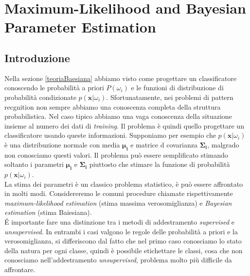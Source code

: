 %
%
%

\chapter{Maximum-Likelihood and Bayesian Parameter Estimation}\label{tecnicheParametriche}
\section{Introduzione}
Nella sezione \ref{teoriaBaesiana} abbiamo visto come progettare un classificatore conoscendo le probabilità a priori $P(\omega_i)$ e le funzioni di distribuzione di probabilità condizionate $p(\mathbf{x}|\omega_i)$. Sfortunatamente, nei problemi di pattern recgnition non sempre abbiamo una conoscenza completa della struttura probabilistica. Nel caso tipico abbiamo una vaga conoscenza della situazione insieme al numero dei dati di \emph{training}. Il problema è quindi quello progettare un classificatore usando queste informazioni.  Supponiamo per esempio che $p(\mathbf{x}|\omega_i)$ è una distribuzione normale con media $\mathbf{\mu_i}$ e matrice d covarianza $\mathbf{\Sigma_i}$, malgrado non conosciamo questi valori. Il problema può essere semplificato stimando soltanto i parametri $\mathbf{\mu_i}$ e $\mathbf{\Sigma_i}$ piuttosto che stimare la funzione di probabilità $p(\mathbf{x}|\omega_i)$.\\

\noindent La stima dei parametri è un classico problema statistico, è può essere affrontato in molti modi. Considereremo le comuni procedure chiamate rispettivamente \emph{maximum-likelihood estimation} (stima massima verosomiglianza) e \emph{Bayesian estimation} (stima Baiesiana).\\

\noindent \'E importante fare una distinzione tra i metodi di addestramento \emph{supervised} e \emph{unsupervised}. In entrambi i casi valgono le regole delle probabilità a priori e la verosomiglianza, si differiscono dal fatto che nel primo caso conosciamo lo stato della natura per ogni classe, quindi è possibile etichettare le classi, cosa che non conosciamo nell'addestramento \emph{unsupervised}, problema molto più difficile da affrontare. 


